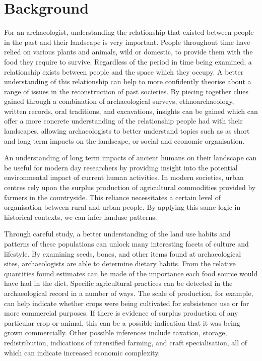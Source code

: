 \section{Background} 

For an archaeologist, understanding the relationship that existed between
people in the past and their landscape is very important.  People throughout
time have relied on various plants and animals, wild or domestic, to provide
them with the food they require to survive.  Regardless of the period in time
being examined, a relationship exists between people and the space which they
occupy.  A better understanding of this relationship can help to more
confidently theorise about a range of issues in the reconstruction of past
societies.  By piecing together clues gained through a combination of
archaeological surveys, ethnoarchaeology, written records, oral traditions, and
excavations, insights can be gained which can offer a more concrete
understanding of the relationship people had with their landscapes, allowing
archaeologists to better understand topics such as as short and long term
impacts on the landscape, or social and economic organisation. 

An understanding
of long term impacts of ancient humans on their landscape can be useful for
modern day researchers by providing insight into the potential environmental
impact of current human activities. In modern societies, urban centres rely upon
the surplus production of agricultural commodities provided by farmers in the
countryside.  This reliance necessitates a certain level of organisation between
rural and urban people.  By applying this same logic in historical contexts, we
can infer landuse patterns.

Through careful study, a better understanding of the land use habits and patterns of these
populations can unlock many interesting facets of culture and lifestyle.
By examining seeds, bones, and other items found at archaeological sites,
archaeologists are able to determine dietary habits. From the relative
quantities found estimates can be made of the importance each food source would
have had in the diet.  Specific agricultural practices can be detected in the
archaeological record in a number of ways.  The scale of production, for example, can help indicate whether crops were being cultivated for subsistence use or for more commercial
purposes.  If there is evidence of surplus production of any particular
crop or animal, this can be a possible indication that it was being grown
commercially.  Other possible inferences include taxation, storage,
redistribution, indications of intensified farming, and craft specialisation,
all of which can indicate increased economic complexity.

